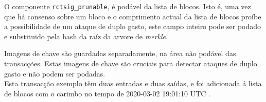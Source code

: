 
O componente {\tt rctsig\_prunable}, é podável da lista de blocos. Isto é, uma vez que há consenso sobre um bloco e o comprimento actual da lista de blocos proíbe a possibilidade de um ataque de duplo gasto, este campo inteiro pode ser podado e substituido pela hash da raíz da arvore de {\em merkle}. 


Imagens de chave são guardadas separadamente, na área não podável das transacções. Estas imagens de chave são cruciais para detectar ataques de duplo gasto e não podem ser podadas. 
\\
Esta transacção exemplo têm duas entradas e duas saídas, e foi adicionada á lista de blocos com o carimbo no tempo de 2020-03-02 19:01:10 UTC . 

